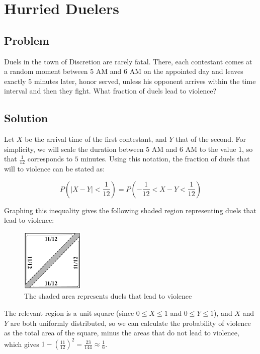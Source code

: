 \documentclass{article}
\date{}
\author{Kaan Aksoy | Feb 27, 2020}
\begin{document}
\maketitle
\section{Hurried Duelers}
\subsection{Problem}

Duels in the town of Discretion are rarely fatal.  There, 
each contestant comes at a random moment between $5$ AM and 
$6$ AM on the appointed day and leaves exactly $5$ minutes later, 
honor served, unless his opponent arrives within the time 
interval and then they fight. What fraction of duels lead to 
violence?

\subsection{Solution}

Let $X$ be the arrival time of the first contestant, and $Y$ 
that of the second. For simplicity, we will scale the duration 
between $5$ AM and $6$ AM to the value $1$, so that $\frac{1}{12}$ 
corresponds to $5$ minutes. Using this notation, the fraction of 
duels that will to violence can be stated as:

$$ P\left(|X - Y| < \frac{1}{12}\right) = 
P\left(-\frac{1}{12} < X - Y < \frac{1}{12}\right)$$

Graphing this inequality gives the following shaded region 
representing duels that lead to violence:

\begin{figure}[h]
\centering
\includegraphics[width=3cm]{HurriedDuelers.png}
\caption{The shaded area represents duels that lead to violence}
\end{figure}

The relevant region is a unit square (since 
$0 \leq X \leq 1$ and $0 \leq Y \leq 1$), and $X$ 
and $Y$ are both uniformly distributed, so we can calculate 
the probability of violence as the total area of the square, 
minus the areas that do not lead to violence, which gives 
$1 - \left(\frac{11}{12}\right)^2 = \frac{23}{144} \approx \frac{1}{6}$.
\end{document}
